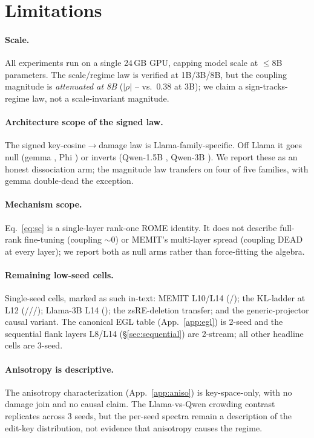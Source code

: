 \section*{Limitations}
\label{sec:limitations}

\paragraph{Scale.} All experiments run on a single 24\,GB GPU, capping model
scale at $\le$8B parameters. The scale/regime law is verified at 1B/3B/8B, but
the coupling magnitude is \emph{attenuated at 8B} ($|\rho|$
\regimeMagAttenLo{}--\regimeMagAttenHi{} vs.\ $0.38$ at 3B); we claim a
sign-tracks-regime law, not a scale-invariant magnitude.

\paragraph{Architecture scope of the signed law.} The signed
key-cosine$\rightarrow$damage law is Llama-family-specific. Off Llama it goes
null (gemma \gemmaSigned{}, Phi \phiSigned{}) or inverts (Qwen-1.5B
\qwenFifteenSigned{}, Qwen-3B \qwenThreeSigned{}). We report these as an honest
dissociation arm; the magnitude law transfers on four of five families, with
gemma double-dead the exception.

\paragraph{Mechanism scope.} Eq.~\ref{eq:sc} is a single-layer rank-one ROME
identity. It does not describe full-rank fine-tuning (coupling $\sim$0) or
MEMIT's multi-layer spread (coupling DEAD at every layer); we report both as
null arms rather than force-fitting the algebra.

\paragraph{Remaining low-seed cells.} Single-seed cells, marked as such
in-text: MEMIT L10/L14 (\memitRhoLten{}/\memitRhoLfourteen{}); the KL-ladder at
L12 (\klLtwelveZeroThree{}/\klLtwelveOne{}/\klLtwelveThree{}/\klLtwelveFull{});
Llama-3B L14 (\llamaThreeBLfourteen{}); the zsRE-deletion transfer; and the
generic-projector causal variant. The canonical EGL table (App.~\ref{app:egl})
is 2-seed and the sequential flank layers L8/L14 (\S\ref{sec:sequential}) are
2-stream; all other headline cells are 3-seed.

\paragraph{Anisotropy is descriptive.} The anisotropy characterization
(App.~\ref{app:aniso}) is key-space-only, with no damage join and no causal
claim. The Llama-vs-Qwen crowding contrast replicates across 3 seeds, but the
per-seed spectra remain a description of the edit-key distribution, not evidence
that anisotropy causes the regime.

